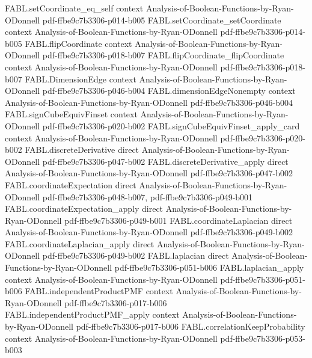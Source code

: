 \begin{theorem}
\proofstep
  {FABL.setCoordinate_eq_self}
  {context}
  {Analysis-of-Boolean-Functions-by-Ryan-ODonnell}
  {pdf-ffbe9c7b3306-p014-b005}
\proofstep
  {FABL.setCoordinate_setCoordinate}
  {context}
  {Analysis-of-Boolean-Functions-by-Ryan-ODonnell}
  {pdf-ffbe9c7b3306-p014-b005}
\proofstep
  {FABL.flipCoordinate}
  {context}
  {Analysis-of-Boolean-Functions-by-Ryan-ODonnell}
  {pdf-ffbe9c7b3306-p018-b007}
\proofstep
  {FABL.flipCoordinate_flipCoordinate}
  {context}
  {Analysis-of-Boolean-Functions-by-Ryan-ODonnell}
  {pdf-ffbe9c7b3306-p018-b007}
\proofstep
  {FABL.DimensionEdge}
  {context}
  {Analysis-of-Boolean-Functions-by-Ryan-ODonnell}
  {pdf-ffbe9c7b3306-p046-b004}
\proofstep
  {FABL.dimensionEdgeNonempty}
  {context}
  {Analysis-of-Boolean-Functions-by-Ryan-ODonnell}
  {pdf-ffbe9c7b3306-p046-b004}
\proofstep
  {FABL.signCubeEquivFinset}
  {context}
  {Analysis-of-Boolean-Functions-by-Ryan-ODonnell}
  {pdf-ffbe9c7b3306-p020-b002}
\proofstep
  {FABL.signCubeEquivFinset_apply_card}
  {context}
  {Analysis-of-Boolean-Functions-by-Ryan-ODonnell}
  {pdf-ffbe9c7b3306-p020-b002}
\proofstep
  {FABL.discreteDerivative}
  {direct}
  {Analysis-of-Boolean-Functions-by-Ryan-ODonnell}
  {pdf-ffbe9c7b3306-p047-b002}
\proofstep
  {FABL.discreteDerivative_apply}
  {direct}
  {Analysis-of-Boolean-Functions-by-Ryan-ODonnell}
  {pdf-ffbe9c7b3306-p047-b002}
\proofstep
  {FABL.coordinateExpectation}
  {direct}
  {Analysis-of-Boolean-Functions-by-Ryan-ODonnell}
  {pdf-ffbe9c7b3306-p048-b007,
    pdf-ffbe9c7b3306-p049-b001}
\proofstep
  {FABL.coordinateExpectation_apply}
  {direct}
  {Analysis-of-Boolean-Functions-by-Ryan-ODonnell}
  {pdf-ffbe9c7b3306-p049-b001}
\proofstep
  {FABL.coordinateLaplacian}
  {direct}
  {Analysis-of-Boolean-Functions-by-Ryan-ODonnell}
  {pdf-ffbe9c7b3306-p049-b002}
\proofstep
  {FABL.coordinateLaplacian_apply}
  {direct}
  {Analysis-of-Boolean-Functions-by-Ryan-ODonnell}
  {pdf-ffbe9c7b3306-p049-b002}
\proofstep
  {FABL.laplacian}
  {direct}
  {Analysis-of-Boolean-Functions-by-Ryan-ODonnell}
  {pdf-ffbe9c7b3306-p051-b006}
\proofstep
  {FABL.laplacian_apply}
  {context}
  {Analysis-of-Boolean-Functions-by-Ryan-ODonnell}
  {pdf-ffbe9c7b3306-p051-b006}
\proofstep
  {FABL.independentProductPMF}
  {context}
  {Analysis-of-Boolean-Functions-by-Ryan-ODonnell}
  {pdf-ffbe9c7b3306-p017-b006}
\proofstep
  {FABL.independentProductPMF_apply}
  {context}
  {Analysis-of-Boolean-Functions-by-Ryan-ODonnell}
  {pdf-ffbe9c7b3306-p017-b006}
\proofstep
  {FABL.correlationKeepProbability}
  {context}
  {Analysis-of-Boolean-Functions-by-Ryan-ODonnell}
  {pdf-ffbe9c7b3306-p053-b003}

\end{theorem}
